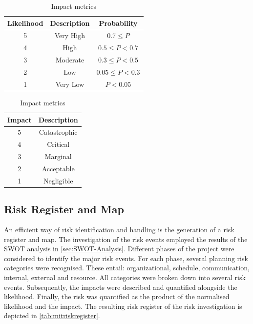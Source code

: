 \begin{table}[ht]
    \centering

    \begin{minipage}{0.5\textwidth}
        \centering
        \begin{tabular}{ccc}
            \hline
            Likelihood & Description & Probability         \\ \hline
            5          & Very High   & $0.7\leq P$         \\
            4          & High        & $ 0.5 \leq P < 0.7$ \\
            3          & Moderate    & $0.3 \leq P < 0.5$  \\
            2          & Low         & $0.05 \leq P < 0.3$ \\
            1          & Very Low    & $P < 0.05$          \\ \hline
        \end{tabular}
        \caption{Likelihood metrics}
        \label{tab:likelihood_metrics}
    \end{minipage}\hfill
    \begin{minipage}{0.5\textwidth}
        \centering
        \begin{tabular}{cc}
            \hline
            Impact & Description  \\ \hline
            5      & Catastrophic \\
            4      & Critical     \\
            3      & Marginal     \\
            2      & Acceptable   \\
            1      & Negligible   \\ \hline
        \end{tabular}
        \caption{Impact metrics}
        \label{tab:impact_metrics}
    \end{minipage}
\end{table}

\subsection{Risk Register and Map}\label{subsec:Risk-Register-and-Map}
An efficient way of risk identification and handling is the generation of a risk register and map.
The investigation of the risk events employed the results of the SWOT analysis in \cref{sec:SWOT-Analysis}. Different phases of the project were considered to identify the major risk events.
For each phase, several planning risk categories were recognised.
These entail: organizational, schedule, communication, internal, external and resource.
All categories were broken down into several risk events. Subsequently, the impacts were described and quantified alongside the likelihood.
Finally, the risk was quantified as the product of the normalised likelihood and the impact.
The resulting risk register of the risk investigation is depicted in \cref{tab:mitriskregister}.

